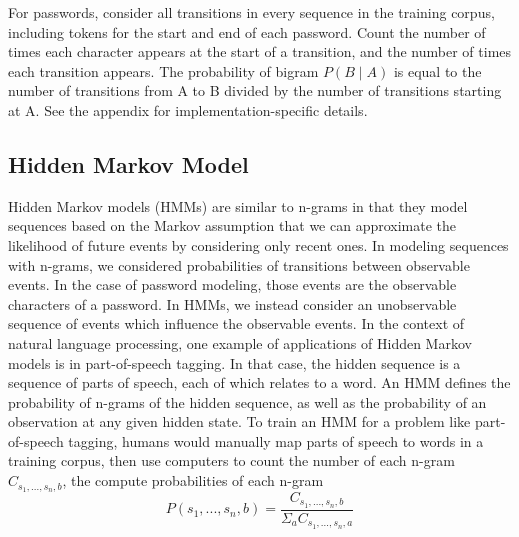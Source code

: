 \documentclass{amsart}
\theoremstyle{definition}
\theoremstyle{remark}
\numberwithin{equation}{section}
\begin{document}
For passwords, consider all transitions in every sequence in the training corpus, including tokens for the start and end of each password. Count the number of times each character appears at the start of a transition, and the number of times each transition appears. The probability of bigram $P(B \mid A)$ is equal to the number of transitions from A to B divided by the number of transitions starting at A. See the appendix for implementation-specific details.

\subsection{Hidden Markov Model}
Hidden Markov models (HMMs) are similar to n-grams in that they model sequences based on the Markov assumption that we can approximate the likelihood of future events by considering only recent ones. In modeling sequences with n-grams, we considered probabilities of transitions between observable events. In the case of password modeling, those events are the observable characters of a password. In HMMs, we instead consider an unobservable sequence of events which influence the observable events. In the context of natural language processing, one example of applications of Hidden Markov models is in part-of-speech tagging. In that case, the hidden sequence is a sequence of parts of speech, each of which relates to a word. An HMM defines the probability of n-grams of the hidden sequence, as well as the probability of an observation at any given hidden state. To train an HMM for a problem like part-of-speech tagging, humans would manually map parts of speech to words in a training corpus, then use computers to count the number of each n-gram $C_{s_1,...,s_n,b}$, the compute probabilities of each n-gram 
$$P(s_1,...,s_n,b) = \frac{C_{s_1,...,s_n,b}}{\Sigma_a C_{s_1,...,s_n,a}}$$
\end{document}
